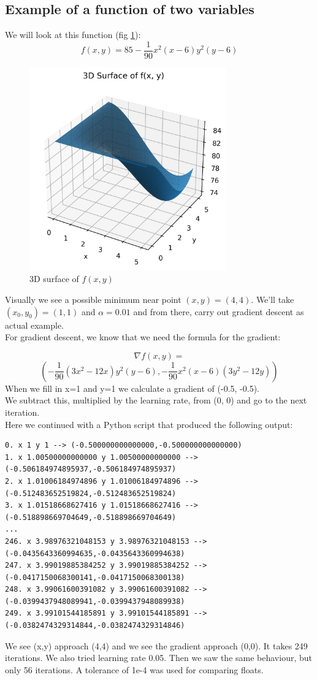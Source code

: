 \documentclass[journal]{IEEEtran}
\begin{document}
\subsection{Example of a function of two variables}
\label{Example2}
We will look at this function (fig \ref{3Dsurface}):
\[
f(x,y) = 85 - \frac{1}{90}x^2(x-6)y^2(y-6)
\]
\begin{figure}[H]
    \includegraphics[width=8.5cm,keepaspectratio]{images/3D_plot.png}
    \caption{3D surface of $f(x,y)$}
    \label{3Dsurface}
\end{figure}
Visually we see a possible minimum near point $(x,y) = (4,4)$.
We'll take $(x_0,y_0) = (1,1)$ and $\alpha = 0.01$ and from there, carry out gradient descent as actual example.\\

For gradient descent, we know that we need the formula for the gradient:

$$
\nabla f(x,y) =
$$
$$
\left( - \frac{1}{90}(3x^2-12x)y^2(y-6), - \frac{1}{90}x^2(x-6)(3y^2-12y) \right)
$$
When we fill in x=1 and y=1 we calculate a gradient of (-0.5, -0.5).\\
We subtract this, multiplied by the learning rate, from (0, 0) and go to the next iteration.\\
Here we continued with a Python script that produced the following output:\\

{\footnotesize
\begin{verbatim}
0. x 1 y 1 --> (-0.500000000000000,-0.500000000000000)
1. x 1.00500000000000 y 1.00500000000000 --> (-0.506184974895937,-0.506184974895937)
2. x 1.01006184974896 y 1.01006184974896 --> (-0.512483652519824,-0.512483652519824)
3. x 1.01518668627416 y 1.01518668627416 --> (-0.518898669704649,-0.518898669704649)
...
246. x 3.98976321048153 y 3.98976321048153 --> (-0.0435643360994635,-0.0435643360994638)
247. x 3.99019885384252 y 3.99019885384252 --> (-0.0417150068300141,-0.0417150068300138)
248. x 3.99061600391082 y 3.99061600391082 --> (-0.0399437948089941,-0.0399437948089938)
249. x 3.99101544185891 y 3.99101544185891 --> (-0.0382474329314844,-0.0382474329314846)
\end{verbatim}
}
We see (x,y) approach (4,4) and we see the gradient approach (0,0). It takes 249 iterations.
We also tried learning rate 0.05. Then we saw the same behaviour, but only 56 iterations.
A tolerance of 1e-4 was used for comparing floats.
\end{document}
